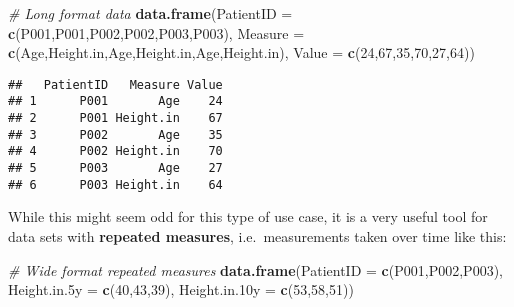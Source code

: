 \documentclass[
]{article}
\newenvironment{Shaded}{\begin{snugshade}}{\end{snugshade}}
\newcommand{\CommentTok}[1]{\textcolor[rgb]{0.56,0.35,0.01}{\textit{#1}}}
\newcommand{\DecValTok}[1]{\textcolor[rgb]{0.00,0.00,0.81}{#1}}
\newcommand{\FunctionTok}[1]{\textcolor[rgb]{0.13,0.29,0.53}{\textbf{#1}}}
\newcommand{\NormalTok}[1]{#1}
\newcommand{\OtherTok}[1]{\textcolor[rgb]{0.56,0.35,0.01}{#1}}
\newcommand{\StringTok}[1]{\textcolor[rgb]{0.31,0.60,0.02}{#1}}
\begin{document}
\begin{Shaded}
\begin{Highlighting}[]
\CommentTok{\# Long format data}
\FunctionTok{data.frame}\NormalTok{(}\StringTok{\textquotesingle{}PatientID\textquotesingle{}} \OtherTok{=} \FunctionTok{c}\NormalTok{(}\StringTok{\textquotesingle{}P001\textquotesingle{}}\NormalTok{,}\StringTok{\textquotesingle{}P001\textquotesingle{}}\NormalTok{,}\StringTok{\textquotesingle{}P002\textquotesingle{}}\NormalTok{,}\StringTok{\textquotesingle{}P002\textquotesingle{}}\NormalTok{,}\StringTok{\textquotesingle{}P003\textquotesingle{}}\NormalTok{,}\StringTok{\textquotesingle{}P003\textquotesingle{}}\NormalTok{),}
           \StringTok{\textquotesingle{}Measure\textquotesingle{}} \OtherTok{=} \FunctionTok{c}\NormalTok{(}\StringTok{\textquotesingle{}Age\textquotesingle{}}\NormalTok{,}\StringTok{\textquotesingle{}Height.in\textquotesingle{}}\NormalTok{,}\StringTok{\textquotesingle{}Age\textquotesingle{}}\NormalTok{,}\StringTok{\textquotesingle{}Height.in\textquotesingle{}}\NormalTok{,}\StringTok{\textquotesingle{}Age\textquotesingle{}}\NormalTok{,}\StringTok{\textquotesingle{}Height.in\textquotesingle{}}\NormalTok{),}
           \StringTok{\textquotesingle{}Value\textquotesingle{}} \OtherTok{=} \FunctionTok{c}\NormalTok{(}\DecValTok{24}\NormalTok{,}\DecValTok{67}\NormalTok{,}\DecValTok{35}\NormalTok{,}\DecValTok{70}\NormalTok{,}\DecValTok{27}\NormalTok{,}\DecValTok{64}\NormalTok{))}
\end{Highlighting}
\end{Shaded}

\begin{verbatim}
##   PatientID   Measure Value
## 1      P001       Age    24
## 2      P001 Height.in    67
## 3      P002       Age    35
## 4      P002 Height.in    70
## 5      P003       Age    27
## 6      P003 Height.in    64
\end{verbatim}

While this might seem odd for this type of use case, it is a very useful
tool for data sets with \textbf{repeated measures}, i.e.~measurements
taken over time like this:

\begin{Shaded}
\begin{Highlighting}[]
\CommentTok{\# Wide format repeated measures}
\FunctionTok{data.frame}\NormalTok{(}\StringTok{\textquotesingle{}PatientID\textquotesingle{}} \OtherTok{=} \FunctionTok{c}\NormalTok{(}\StringTok{\textquotesingle{}P001\textquotesingle{}}\NormalTok{,}\StringTok{\textquotesingle{}P002\textquotesingle{}}\NormalTok{,}\StringTok{\textquotesingle{}P003\textquotesingle{}}\NormalTok{),}
           \StringTok{\textquotesingle{}Height.in.5y\textquotesingle{}} \OtherTok{=} \FunctionTok{c}\NormalTok{(}\DecValTok{40}\NormalTok{,}\DecValTok{43}\NormalTok{,}\DecValTok{39}\NormalTok{),}
           \StringTok{\textquotesingle{}Height.in.10y\textquotesingle{}} \OtherTok{=} \FunctionTok{c}\NormalTok{(}\DecValTok{53}\NormalTok{,}\DecValTok{58}\NormalTok{,}\DecValTok{51}\NormalTok{))}
\end{Highlighting}
\end{Shaded}
\end{document}
